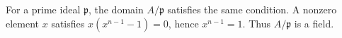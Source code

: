 For a prime ideal $\mathfrak p$, the domain $A/\mathfrak p$ satisfies the same condition. A nonzero element $x$ satisfies $x(x^{n-1}-1)=0$, hence $x^{n-1}=1$. Thus $A/\mathfrak p$ is a field.
